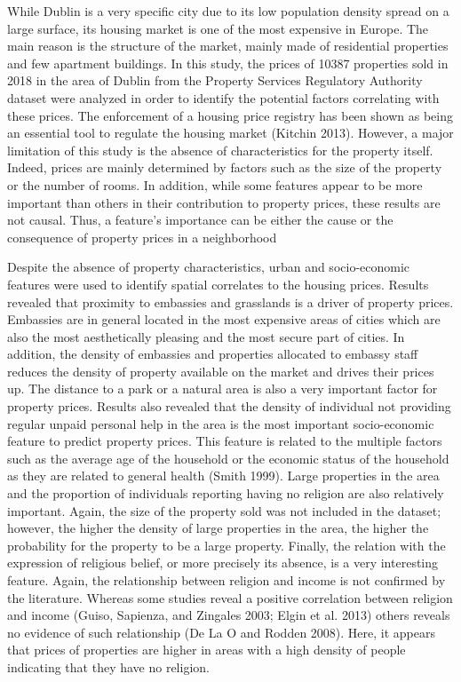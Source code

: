 \documentclass[conference,final,]{IEEEtran}
\begin{document}
While Dublin is a very specific city due to its low population density spread on a large surface, its housing market is one of the most expensive in Europe. The main reason is the structure of the market, mainly made of residential properties and few apartment buildings. In this study, the prices of 10387 properties sold in 2018 in the area of Dublin from the Property Services Regulatory Authority dataset were analyzed in order to identify the potential factors correlating with these prices. The enforcement of a housing price registry has been shown as being an essential tool to regulate the housing market (Kitchin 2013). However, a major limitation of this study is the absence of characteristics for the property itself. Indeed, prices are mainly determined by factors such as the size of the property or the number of rooms. In addition, while some features appear to be more important than others in their contribution to property prices, these results are not causal. Thus, a feature's importance can be either the cause or the consequence of property prices in a neighborhood

Despite the absence of property characteristics, urban and socio-economic features were used to identify spatial correlates to the housing prices. Results revealed that proximity to embassies and grasslands is a driver of property prices. Embassies are in general located in the most expensive areas of cities which are also the most aesthetically pleasing and the most secure part of cities. In addition, the density of embassies and properties allocated to embassy staff reduces the density of property available on the market and drives their prices up. The distance to a park or a natural area is also a very important factor for property prices. Results also revealed that the density of individual not providing regular unpaid personal help in the area is the most important socio-economic feature to predict property prices. This feature is related to the multiple factors such as the average age of the household or the economic status of the household as they are related to general health (Smith 1999). Large properties in the area and the proportion of individuals reporting having no religion are also relatively important. Again, the size of the property sold was not included in the dataset; however, the higher the density of large properties in the area, the higher the probability for the property to be a large property. Finally, the relation with the expression of religious belief, or more precisely its absence, is a very interesting feature. Again, the relationship between religion and income is not confirmed by the literature. Whereas some studies reveal a positive correlation between religion and income (Guiso, Sapienza, and Zingales 2003; Elgin et al. 2013) others reveals no evidence of such relationship (De La O and Rodden 2008). Here, it appears that prices of properties are higher in areas with a high density of people indicating that they have no religion.
\end{document}
